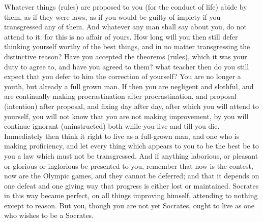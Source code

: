 Whatever things (rules) are proposed to you  (for the conduct of life) abide by
them,  as if  they were  laws, as  if you  would be  guilty of  impiety if  you
transgressed any  of them.  And whatever any  man shall say  about you,  do not
attend  to  it: for  this  is  no  affair of  yours.  How  long will  you  then
still  defer thinking  yourself worthy  of the  best things,  and in  no matter
transgressing the distinctive  reason? Have you accepted  the theorems (rules),
which it was your  duty to agree to, and have you agreed  to them? what teacher
then do you still expect that you  defer to him the correction of yourself? You
are no longer a youth, but already a  full grown man. If then you are negligent
and slothful, and are continually making procrastination after procrastination,
and proposal (intention) after proposal, and  fixing day after day, after which
you  will attend  to  yourself, you  will  not  know that  you  are not  making
improvement, by you  will continue ignorant (uninstructed) both  while you live
and till you die. Immediately then think  it right to live as a full-grown man,
and one who is making proficiency, and  let every thing which appears to you to
be the  best be to you  a law which must  not be transgressed. And  if anything
laborious, or pleasant or glorious or  inglorious be presented to you, remember
that  now is  the  contest, now  are  the  Olympic games,  and  they cannot  be
deferred; and that it depends on one defeat and one giving way that progress is
either lost or  maintained. Socrates in this way became  perfect, on all things
improving himself, attending  to nothing except to reason. But  you, though you
are not yet Socrates, ought to live as one who wishes to be a Socrates.
